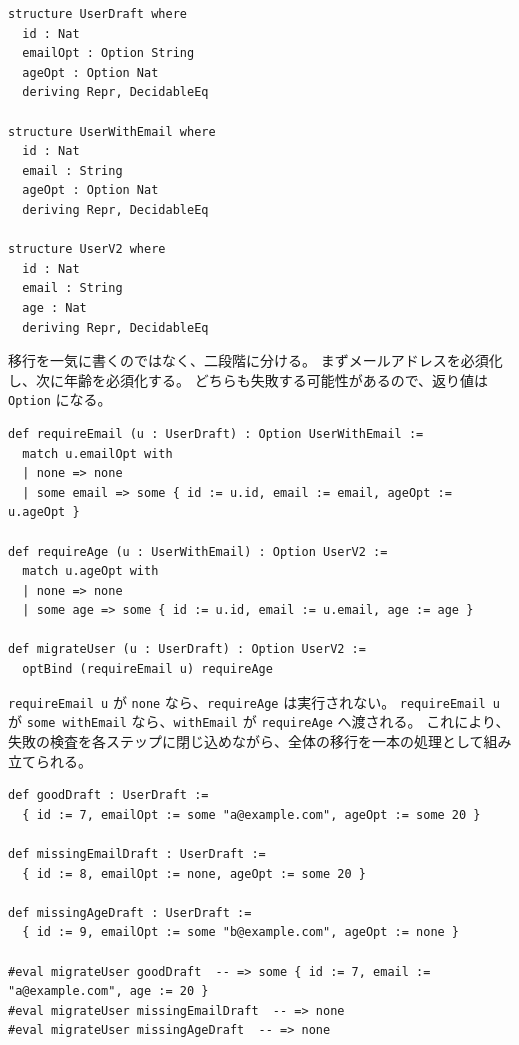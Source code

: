 \begin{listing}[htbp]
\begin{verbatim}
structure UserDraft where
  id : Nat
  emailOpt : Option String
  ageOpt : Option Nat
  deriving Repr, DecidableEq

structure UserWithEmail where
  id : Nat
  email : String
  ageOpt : Option Nat
  deriving Repr, DecidableEq

structure UserV2 where
  id : Nat
  email : String
  age : Nat
  deriving Repr, DecidableEq
\end{verbatim}
\caption{移行前後の小さなデータモデル}
\label{lst:ch11_user_model}
\end{listing}

移行を一気に書くのではなく、二段階に分ける。
まずメールアドレスを必須化し、次に年齢を必須化する。
どちらも失敗する可能性があるので、返り値は \texttt{Option} になる。

\begin{listing}[htbp]
\begin{verbatim}
def requireEmail (u : UserDraft) : Option UserWithEmail :=
  match u.emailOpt with
  | none => none
  | some email => some { id := u.id, email := email, ageOpt := u.ageOpt }

def requireAge (u : UserWithEmail) : Option UserV2 :=
  match u.ageOpt with
  | none => none
  | some age => some { id := u.id, email := u.email, age := age }

def migrateUser (u : UserDraft) : Option UserV2 :=
  optBind (requireEmail u) requireAge
\end{verbatim}
\caption{失敗しうる移行ステップを bind で合成する}
\label{lst:ch11_user_migration}
\end{listing}

\texttt{requireEmail u} が \texttt{none} なら、\texttt{requireAge} は実行されない。
\texttt{requireEmail u} が \texttt{some withEmail} なら、\texttt{withEmail} が \texttt{requireAge} へ渡される。
これにより、失敗の検査を各ステップに閉じ込めながら、全体の移行を一本の処理として組み立てられる。

\begin{listing}[htbp]
\begin{verbatim}
def goodDraft : UserDraft :=
  { id := 7, emailOpt := some "a@example.com", ageOpt := some 20 }

def missingEmailDraft : UserDraft :=
  { id := 8, emailOpt := none, ageOpt := some 20 }

def missingAgeDraft : UserDraft :=
  { id := 9, emailOpt := some "b@example.com", ageOpt := none }

#eval migrateUser goodDraft  -- => some { id := 7, email := "a@example.com", age := 20 }
#eval migrateUser missingEmailDraft  -- => none
#eval migrateUser missingAgeDraft  -- => none
\end{verbatim}
\caption{成功例と失敗例}
\label{lst:ch11_user_examples}
\end{listing}

